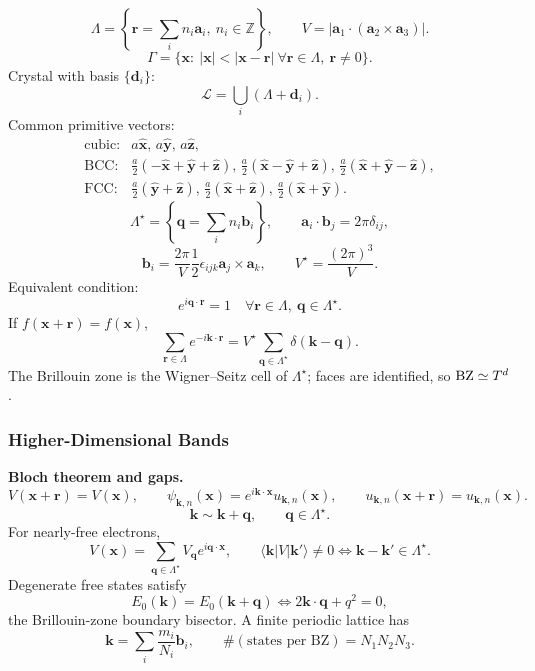 \[
\Lambda=\left\{\mathbf r=\sum_i n_i\mathbf a_i,\ n_i\in\mathbb Z\right\},\qquad
V=|\mathbf a_1\cdot(\mathbf a_2\times\mathbf a_3)|.
\]
\[
\Gamma=\{\mathbf x:\ |\mathbf x|<|\mathbf x-\mathbf r|\ \forall\mathbf r\in\Lambda,\ \mathbf r\ne0\}.
\]
Crystal with basis $\{\mathbf d_i\}$:
\[
\mathcal L=\bigcup_i(\Lambda+\mathbf d_i).
\]
Common primitive vectors:
\[
\begin{array}{ll}
\text{cubic:}&a\hat{\mathbf x},\,a\hat{\mathbf y},\,a\hat{\mathbf z},\\[0.2em]
\text{BCC:}&\frac a2(-\hat{\mathbf x}+\hat{\mathbf y}+\hat{\mathbf z}),\,
\frac a2(\hat{\mathbf x}-\hat{\mathbf y}+\hat{\mathbf z}),\,
\frac a2(\hat{\mathbf x}+\hat{\mathbf y}-\hat{\mathbf z}),\\[0.2em]
\text{FCC:}&\frac a2(\hat{\mathbf y}+\hat{\mathbf z}),\,
\frac a2(\hat{\mathbf x}+\hat{\mathbf z}),\,
\frac a2(\hat{\mathbf x}+\hat{\mathbf y}).
\end{array}
\]
\[
\Lambda^\star=\left\{\mathbf q=\sum_i n_i\mathbf b_i\right\},\qquad
\boxed{\mathbf a_i\cdot\mathbf b_j=2\pi\delta_{ij}},
\]
\[
\mathbf b_i=\frac{2\pi}{V}\frac12\epsilon_{ijk}\mathbf a_j\times\mathbf a_k,\qquad
V^\star=\frac{(2\pi)^3}{V}.
\]
Equivalent condition:
\[
e^{i\mathbf q\cdot\mathbf r}=1\quad
\forall\mathbf r\in\Lambda,\ \mathbf q\in\Lambda^\star.
\]
If $f(\mathbf x+\mathbf r)=f(\mathbf x)$,
\[
\sum_{\mathbf r\in\Lambda}e^{-i\mathbf k\cdot\mathbf r}
=\boxed{V^\star\sum_{\mathbf q\in\Lambda^\star}\delta(\mathbf k-\mathbf q)}.
\]
The Brillouin zone is the Wigner--Seitz cell of $\Lambda^\star$; faces are identified,
so ${\rm BZ}\simeq T^d$. 

\subsubsection*{Higher-Dimensional Bands}

\noindent\textbf{Bloch theorem and gaps.}
\[
V(\mathbf x+\mathbf r)=V(\mathbf x),\qquad
\boxed{\psi_{\mathbf k,n}(\mathbf x)=e^{i\mathbf k\cdot\mathbf x}u_{\mathbf k,n}(\mathbf x)},
\qquad
u_{\mathbf k,n}(\mathbf x+\mathbf r)=u_{\mathbf k,n}(\mathbf x).
\]
\[
\mathbf k\sim\mathbf k+\mathbf q,\qquad \mathbf q\in\Lambda^\star.
\]
For nearly-free electrons,
\[
V(\mathbf x)=\sum_{\mathbf q\in\Lambda^\star}V_{\mathbf q}e^{i\mathbf q\cdot\mathbf x},
\qquad
\langle\mathbf k|V|\mathbf k'\rangle\ne0\iff\mathbf k-\mathbf k'\in\Lambda^\star.
\]
Degenerate free states satisfy
\[
E_0(\mathbf k)=E_0(\mathbf k+\mathbf q)
\iff 2\mathbf k\cdot\mathbf q+q^2=0,
\]
the Brillouin-zone boundary bisector. A finite periodic lattice has
\[
\mathbf k=\sum_i\frac{m_i}{N_i}\mathbf b_i,\qquad
\#(\text{states per BZ})=N_1N_2N_3.
\]

